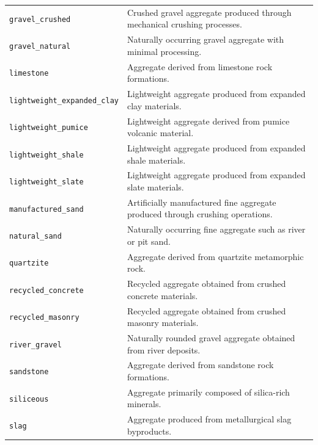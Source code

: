 \documentclass[11pt]{book}
\begin{document}
{\begin{longtable}{p{}p{}}
\texttt{gravel\_crushed} &
Crushed gravel aggregate produced through mechanical crushing processes. \\

\texttt{gravel\_natural} &
Naturally occurring gravel aggregate with minimal processing. \\

\texttt{limestone} &
Aggregate derived from limestone rock formations. \\

\texttt{lightweight\_expanded\_clay} &
Lightweight aggregate produced from expanded clay materials. \\

\texttt{lightweight\_pumice} &
Lightweight aggregate derived from pumice volcanic material. \\

\texttt{lightweight\_shale} &
Lightweight aggregate produced from expanded shale materials. \\

\texttt{lightweight\_slate} &
Lightweight aggregate produced from expanded slate materials. \\

\texttt{manufactured\_sand} &
Artificially manufactured fine aggregate produced through crushing operations. \\

\texttt{natural\_sand} &
Naturally occurring fine aggregate such as river or pit sand. \\

\texttt{quartzite} &
Aggregate derived from quartzite metamorphic rock. \\

\texttt{recycled\_concrete} &
Recycled aggregate obtained from crushed concrete materials. \\

\texttt{recycled\_masonry} &
Recycled aggregate obtained from crushed masonry materials. \\

\texttt{river\_gravel} &
Naturally rounded gravel aggregate obtained from river deposits. \\

\texttt{sandstone} &
Aggregate derived from sandstone rock formations. \\

\texttt{siliceous} &
Aggregate primarily composed of silica-rich minerals. \\

\texttt{slag} &
Aggregate produced from metallurgical slag byproducts. \\


\end{longtable}}
\end{document}
